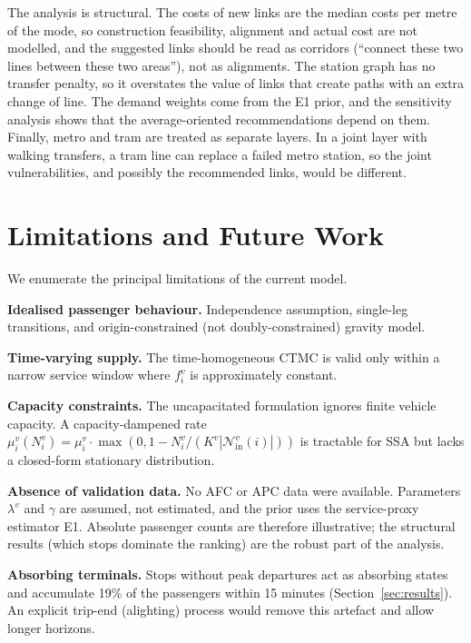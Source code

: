\documentclass[12pt,a4paper]{article}
\theoremstyle{plain}
\theoremstyle{definition}
\theoremstyle{remark}
\begin{document}
The analysis is structural.  The costs of new links are the median costs per
metre of the mode, so construction feasibility, alignment and actual cost
are not modelled, and the suggested links should be read as corridors
(``connect these two lines between these two areas''), not as alignments.  The
station graph has no transfer penalty, so it overstates the value of links
that create paths with an extra change of line.  The demand weights come from
the E1 prior, and the sensitivity analysis shows that the average-oriented
recommendations depend on them.  Finally, metro and tram are treated as
separate layers.  In a joint layer with walking transfers, a tram line can
replace a failed metro station, so the joint vulnerabilities, and possibly the
recommended links, would be different.

\section{Limitations and Future Work}
\label{sec:limitations}

We enumerate the principal limitations of the current model.

\textbf{Idealised passenger behaviour.}  Independence assumption, single-leg
transitions, and origin-constrained (not doubly-constrained) gravity model.

\textbf{Time-varying supply.}  The time-homogeneous CTMC is valid only within
a narrow service window where $f^v_i$ is approximately constant.

\textbf{Capacity constraints.}  The uncapacitated formulation ignores finite
vehicle capacity.  A capacity-dampened rate
$\mu^v_i(N^v_i)=\mu^v_i\cdot\max(0,1-N^v_i/(K^v|\mathcal{N}^v_{\mathrm{in}}(i)|))$
is tractable for SSA but lacks a closed-form stationary distribution.

\textbf{Absence of validation data.}  No AFC or APC data were available.
Parameters $\lambda^v$ and $\gamma$ are assumed, not estimated, and the prior
uses the service-proxy estimator E1.  Absolute passenger counts are therefore
illustrative; the structural results (which stops dominate the ranking) are the
robust part of the analysis.

\textbf{Absorbing terminals.}  Stops without peak departures act as absorbing
states and accumulate 19\% of the passengers within 15 minutes
(Section~\ref{sec:results}).  An explicit trip-end (alighting) process would
remove this artefact and allow longer horizons.
\end{document}
